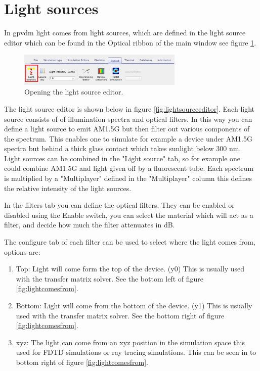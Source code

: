 \section{Light sources}
In gpvdm light comes from light sources, which are defined in the light source editor which can be found in the Optical ribbon of the main window see figure \ref{fig:opticalribbon}.

\begin{figure}[H]
\centering
\includegraphics[width=0.7\textwidth]{./images/light_ribbon.png}
\caption{Opening the light source editor.}
\label{fig:opticalribbon}
\end{figure}

The light source editor is shown below in figure \ref{fig:lightsourceeditor}. Each light source consists of of illumination spectra and optical filters. In this way you can define a light source to emit AM1.5G but then filter out various components of the spectrum.  This enables one to simulate for example a device under AM1.5G spectra but behind a thick glass contact which takes sunlight below 300 nm. Light sources can be combined in the "Light source" tab, so for example one could combine AM1.5G and light given off by a fluorescent tube. Each spectrum is multiplied by a "Multiplayer" defined in the "Multiplayer" column this defines the relative intensity of the light sources.

In the filters tab you can define the optical filters. They can be enabled or disabled using the Enable switch, you can select the material which will act as a filter, and decide how much the filter attenuates in dB.

The configure tab of each filter can be used to select where the light comes from, options are:

\begin{enumerate}
  \item Top: Light will come form the top of the device. (y0) This is usually used with the transfer matrix solver. See the bottom left of figure \ref{fig:lightcomesfrom}.
  \item Bottom: Light will come from the bottom of the device. (y1)  This is usually used with the transfer matrix solver.  See the bottom right of figure \ref{fig:lightcomesfrom}.
  \item xyz: The light can come from an xyz position in the simulation space this used for FDTD simulations or ray tracing simulations.  This can be seen in to bottom right of figure \ref{fig:lightcomesfrom}.
\end{enumerate}

